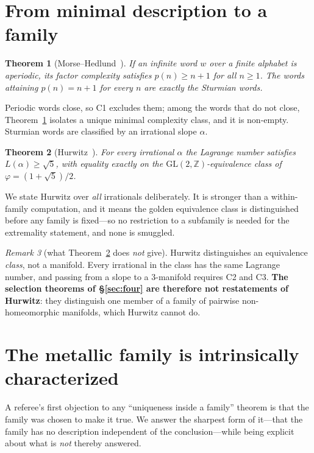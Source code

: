 \documentclass[11pt,reqno]{amsart}
\theoremstyle{plain}
\newtheorem{theorem}{Theorem}[section]
\theoremstyle{definition}
\theoremstyle{remark}
\newtheorem{remark}[theorem]{Remark}
\newcommand{\Z}{\mathbb{Z}}
\newcommand{\GL}{\mathrm{GL}}
\begin{document}
\section{From minimal description to a family}\label{sec:genesis}

\begin{theorem}[Morse--Hedlund~\cite{MorseHedlund}]\label{thm:mh}
If an infinite word $w$ over a finite alphabet is aperiodic, its factor complexity
satisfies $p(n)\ge n+1$ for all $n\ge1$. The words attaining $p(n)=n+1$ for every $n$
are exactly the Sturmian words.
\end{theorem}

Periodic words close, so C1 excludes them; among the words that do not close,
Theorem~\ref{thm:mh} isolates a unique minimal complexity class, and it is non-empty.
Sturmian words are classified by an irrational slope $\alpha$.

\begin{theorem}[Hurwitz~\cite{Hurwitz}]\label{thm:hurwitz}
For every irrational $\alpha$ the Lagrange number satisfies $L(\alpha)\ge\sqrt5$, with
equality exactly on the $\GL(2,\Z)$-equivalence class of $\varphi=(1+\sqrt5)/2$.
\end{theorem}

We state Hurwitz over \emph{all} irrationals deliberately. It is stronger than a
within-family computation, and it means the golden equivalence class is distinguished
before any family is fixed---so no restriction to a subfamily is needed for the
extremality statement, and none is smuggled.

\begin{remark}[what Theorem~\ref{thm:hurwitz} does \emph{not} give]\label{rem:hurwitzlimit}
Hurwitz distinguishes an equivalence \emph{class}, not a manifold. Every irrational in
the class has the same Lagrange number, and passing from a slope to a $3$-manifold
requires C2 and C3. \textbf{The selection theorems of \S\ref{sec:four} are therefore not
restatements of Hurwitz}: they distinguish one member of a family of pairwise
non-homeomorphic manifolds, which Hurwitz cannot do.
\end{remark}

\section{The metallic family is intrinsically characterized}\label{sec:canonical}

A referee's first objection to any ``uniqueness inside a family'' theorem is that the
family was chosen to make it true. We answer the sharpest form of it---that the family
has no description independent of the conclusion---while being explicit about what is
\emph{not} thereby answered.
\end{document}
